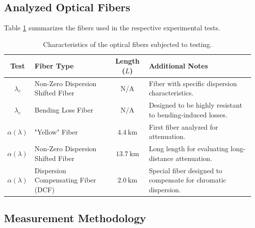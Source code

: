 \documentclass[a4paper,11pt]{article}
\theoremstyle{mythmstyle}
\begin{document}
\subsection{Analyzed Optical Fibers}
Table \ref{tab:fibre} summarizes the fibers used in the respective experimental tests.

\begin{table}[h]
    \centering
    \caption{Characteristics of the optical fibers subjected to testing.}
    \label{tab:fibre}
    \begin{tabularx}{\textwidth}{@{} c l c X @{}} %
        \toprule
        \textbf{Test} & \textbf{Fiber Type} & \textbf{Length ($L$)} & \textbf{Additional Notes} \\
        \midrule
        $\lambda_c$ & Non-Zero Dispersion Shifted Fiber & N/A & Fiber with specific dispersion characteristics. \\
        $\lambda_c$ & Bending Loss Fiber & N/A & Designed to be highly resistant to bending-induced losses. \\
        $\alpha(\lambda)$ & "Yellow" Fiber & $4.4\ \text{km}$ & First fiber analyzed for attenuation. \\
        $\alpha(\lambda)$ & Non-Zero Dispersion Shifted Fiber & $13.7\ \text{km}$ & Long length for evaluating long-distance attenuation. \\
        $\alpha(\lambda)$ & Dispersion Compensating Fiber (DCF) & $2.0\ \text{km}$ & Special fiber designed to compensate for chromatic dispersion. \\
        \bottomrule
    \end{tabularx}
\end{table}

\subsection{Measurement Methodology}
\end{document}
